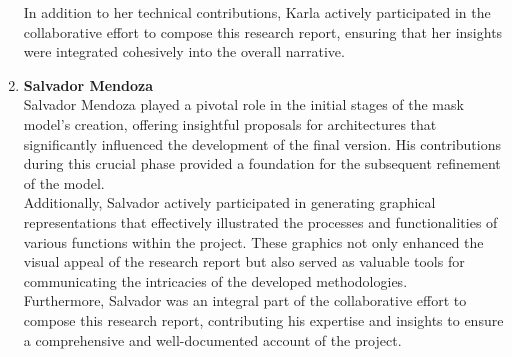 \documentclass[runningheads]{llncs}
\begin{document}
\begin{enumerate}
    In addition to her technical contributions, Karla actively participated in the collaborative effort to compose this research report, ensuring that her insights were integrated cohesively into the overall narrative.\\
    
    \item \textbf{Salvador Mendoza}\\
    
    Salvador Mendoza played a pivotal role in the initial stages of the mask model's creation, offering insightful proposals for architectures that significantly influenced the development of the final version. His contributions during this crucial phase provided a foundation for the subsequent refinement of the model.\\

    Additionally, Salvador actively participated in generating graphical representations that effectively illustrated the processes and functionalities of various functions within the project. These graphics not only enhanced the visual appeal of the research report but also served as valuable tools for communicating the intricacies of the developed methodologies.\\
    
    Furthermore, Salvador was an integral part of the collaborative effort to compose this research report, contributing his expertise and insights to ensure a comprehensive and well-documented account of the project.
\end{enumerate}

\newpage
\printbibliography
\end{document}
